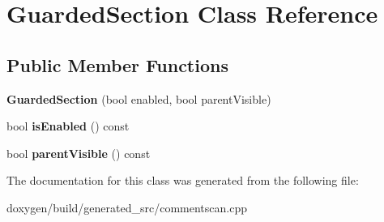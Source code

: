 \hypertarget{class_guarded_section}{}\section{Guarded\+Section Class Reference}
\label{class_guarded_section}
\subsection*{Public Member Functions}
\begin{DoxyCompactItemize}
\item 
\mbox{\label{class_guarded_section_a705b980ef9c030f19686634b3f0c01a2}} 
{\bfseries Guarded\+Section} (bool enabled, bool parent\+Visible)
\item 
\mbox{\label{class_guarded_section_a56cd1d1f58762dde6e4a3264bc1c63ea}} 
bool {\bfseries is\+Enabled} () const
\item 
\mbox{\label{class_guarded_section_a9645c62b72fb62d21814d48390b2bc6f}} 
bool {\bfseries parent\+Visible} () const
\end{DoxyCompactItemize}


The documentation for this class was generated from the following file\+:\begin{DoxyCompactItemize}
\item 
doxygen/build/generated\+\_\+src/commentscan.\+cpp\end{DoxyCompactItemize}
